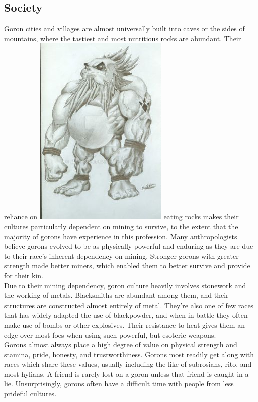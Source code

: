 \documentclass[10pt,twoside,twocolumn,openany]{book}
\begin{document}
\subsection{Society}
Goron cities and villages are almost universally built into caves or the sides of mountains, where the tastiest and most nutritious rocks are abundant. Their reliance on 
\includegraphics{darunia.jpg}
eating rocks makes their cultures particularly dependent on mining to survive, to the extent that the majority of gorons have experience in this profession. Many anthropologists believe gorons evolved to be as physically powerful and enduring as they are due to their race's inherent dependency on mining. Stronger gorons with greater strength made better miners, which enabled them to better survive and provide for their kin.\\
Due to their mining dependency, goron culture heavily involves stonework and the working of metals. Blacksmiths are abundant among them, and their structures are constructed almost entirely of metal. They're also one of few races that has widely adapted the use of blackpowder, and when in battle they often make use of bombs or other explosives. Their resistance to heat gives them an edge over most foes when using such powerful, but esoteric weapons.\\
Gorons almost always place a high degree of value on physical strength and stamina, pride, honesty, and trustworthiness. Gorons most readily get along with races which share these values, usually including the like of subrosians, rito, and most hylians. A friend is rarely lost on a goron unless that friend is caught in a lie. Unsurprisingly, gorons often have a difficult time with people from less prideful cultures.\\
\end{document}
